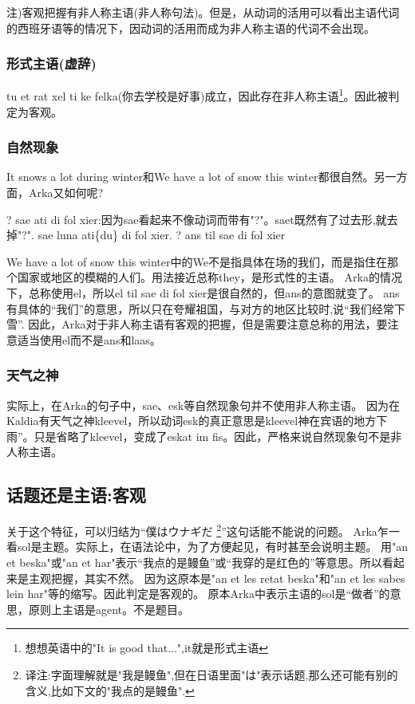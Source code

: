 注)客观把握有非人称主语(非人称句法)。但是，从动词的活用可以看出主语代词的西班牙语等的情况下，因动词的活用而成为非人称主语的代词不会出现。

\subsubsection{形式主语(虚辞)}

tu et rat xel ti ke felka(你去学校是好事)成立，因此存在非人称主语\footnote{想想英语中的"It is good that...",it就是形式主语}。因此被判定为客观。

\subsubsection{自然现象}

It snows a lot during winter和We have a lot of snow this winter都很自然。另一方面，Arka又如何呢?

? sae ati di fol xier:因为sae看起来不像动词而带有"?"。saet既然有了过去形,就去掉"?".
sae luna ati\{du\} di fol xier.
? ans til sae di fol xier

We have a lot of snow this winter中的We不是指具体在场的我们，而是指住在那个国家或地区的模糊的人们。用法接近总称they，是形式性的主语。
Arka的情况下，总称使用el，所以el til sae di fol xier是很自然的，但ans的意图就变了。
ans有具体的“我们”的意思，所以只在夸耀祖国，与对方的地区比较时,说“我们经常下雪”.
因此，Arka对于非人称主语有客观的把握，但是需要注意总称的用法，要注意适当使用el而不是ans和laas。

\subsubsection{天气之神}

实际上，在Arka的句子中，sae、esk等自然现象句并不使用非人称主语。
因为在Kaldia有天气之神kleevel，所以动词esk的真正意思是kleevel神在宾语的地方下雨”。只是省略了kleevel，变成了eskat im fis。因此，严格来说自然现象句不是非人称主语。

\subsection{话题还是主语:客观}

关于这个特征，可以归结为“僕はウナギだ
\footnote{译注:字面理解就是"我是鳗鱼",但在日语里面"は"表示话题,那么还可能有别的含义,比如下文的"我点的是鳗鱼".}”这句话能不能说的问题。
Arka乍一看sol是主题。实际上，在语法论中，为了方便起见，有时甚至会说明主题。
用"an et beska"或"an et har"表示“我点的是鳗鱼”或“我穿的是红色的”等意思。所以看起来是主观把握，其实不然。
因为这原本是"an et les retat beska"和"an et les sabes lein har"等的缩写。因此判定是客观的。
原本Arka中表示主语的sol是“做者”的意思，原则上主语是agent。不是题目。

